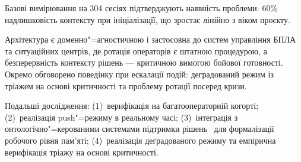 \documentclass[11pt]{article}
\begin{document}
Базові вимірювання на 304 сесіях підтверджують наявність проблеми: 60\% надлишковість контексту при ініціалізації, що зростає лінійно з віком проєкту.

Архітектура є доменно"=агностичною і застосовна до систем управління БПЛА та ситуаційних центрів, де ротація операторів є штатною процедурою, а безперервність контексту рішень --- критичною вимогою бойової готовності.
Окремо обговорено поведінку при ескалації подій: деградований режим із тріажем на основі критичності та проблему ротації посеред кризи.

Подальші дослідження: (1)~верифікація на багатооператорній когорті; (2)~реалізація push"=режиму в реальному часі; (3)~інтеграція з онтологічно"=керованими системами підтримки рішень~\citep{palagin2006architecture} для формалізації робочого рівня пам'яті; (4)~реалізація деградованого режиму та емпірична верифікація тріажу на основі критичності.




\end{document}

